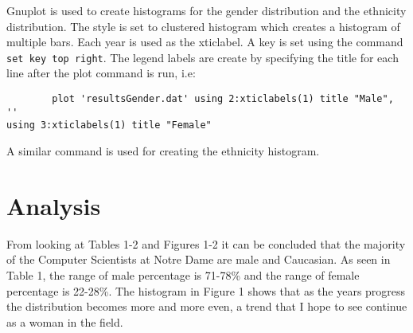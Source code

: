 \documentclass{article}
\begin{document}
    Gnuplot is used to create histograms for the gender distribution and 
the ethnicity distribution.  The style is set to clustered histogram 
which creates a histogram of multiple bars.  Each year is used as the 
xticlabel.  A key is set using the command \verb|set key top right|.  
The legend labels are create by specifying the title for each line after 
the plot command is run, i.e:
    \begin{verbatim}
        plot 'resultsGender.dat' using 2:xticlabels(1) title "Male", '' 
using 3:xticlabels(1) title "Female"
    \end{verbatim}
        A similar command is used for creating the ethnicity histogram.
        
\section*{Analysis}
    From looking at Tables 1-2 and Figures 1-2 it can be concluded that 
the majority of the Computer Scientists at Notre Dame are male and 
Caucasian.  As seen in Table 1, the range of male percentage is 71-78\% 
and the range of female percentage is 22-28\%.  The histogram in Figure 
1 shows that as the years progress the distribution becomes more and 
more even, a trend that I hope to see continue as a woman in the field.
    
\end{document}
